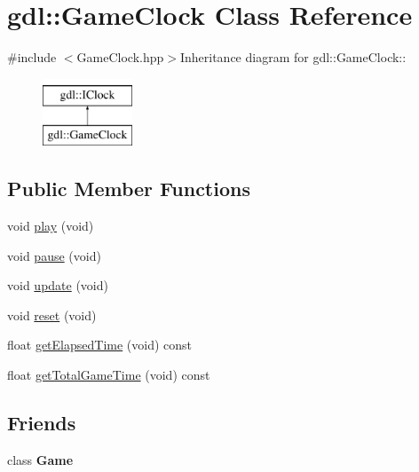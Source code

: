 \hypertarget{classgdl_1_1GameClock}{
\section{gdl::GameClock Class Reference}
\label{classgdl_1_1GameClock}
}


{\ttfamily \#include $<$GameClock.hpp$>$}Inheritance diagram for gdl::GameClock::\begin{figure}[H]
\begin{center}
\leavevmode
\includegraphics[height=2cm]{classgdl_1_1GameClock}
\end{center}
\end{figure}
\subsection*{Public Member Functions}
\begin{DoxyCompactItemize}
\item 
void \hyperlink{classgdl_1_1GameClock_aa7ad30c03dec94bc5b21a4fcad290644}{play} (void)
\item 
void \hyperlink{classgdl_1_1GameClock_aab85df27e686f8dbc0bcdb009a6e9158}{pause} (void)
\item 
void \hyperlink{classgdl_1_1GameClock_adb1151b518f6ee38a169b25b75542311}{update} (void)
\item 
void \hyperlink{classgdl_1_1GameClock_af568839e075e6e3c2b7aad91450d16d2}{reset} (void)
\item 
float \hyperlink{classgdl_1_1GameClock_a4c089f024d7b1448bc0d24f6a2785281}{getElapsedTime} (void) const 
\item 
float \hyperlink{classgdl_1_1GameClock_a8769e925304d57d6c6949c8bedec7956}{getTotalGameTime} (void) const 
\end{DoxyCompactItemize}
\subsection*{Friends}
\begin{DoxyCompactItemize}
\item 
\hypertarget{classgdl_1_1GameClock_aa2fab026580d6f14280c2ffb8063a314}{
class {\bfseries Game}}
\label{classgdl_1_1GameClock_aa2fab026580d6f14280c2ffb8063a314}

\end{DoxyCompactItemize}


